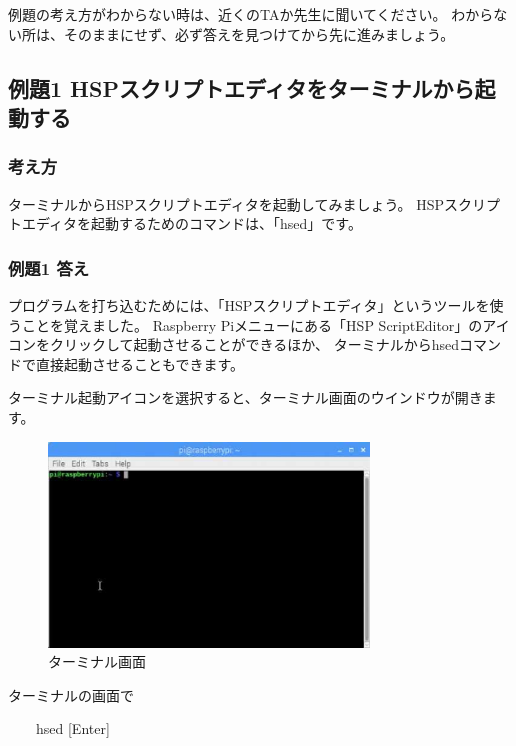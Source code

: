 \noindent
例題の考え方がわからない時は、近くのTAか先生に聞いてください。
わからない所は、そのままにせず、必ず答えを見つけてから先に進みましょう。
\clearpage

% 
% 
% 
\subsection{例題1 HSPスクリプトエディタをターミナルから起動する}

\subsubsection*{考え方}

ターミナルからHSPスクリプトエディタを起動してみましょう。
HSPスクリプトエディタを起動するためのコマンドは、「hsed」です。

\subsubsection*{例題1 答え}

プログラムを打ち込むためには、「HSPスクリプトエディタ」というツールを使うことを覚えました。
Raspberry Piメニューにある「HSP ScriptEditor」のアイコンをクリックして起動させることができるほか、
ターミナルからhsedコマンドで直接起動させることもできます。

ターミナル起動アイコンを選択すると、ターミナル画面のウインドウが開きます。

\begin{figure}[H]
  \begin{center}
    \includegraphics[keepaspectratio,width=8.52cm,height=5.45cm]{images/chap02/text02-img004.png}
    \caption{ターミナル画面}
  \end{center}
  \label{fig:terminal}
\end{figure}

ターミナルの画面で

\vspace{1em}
\ \ \ \ hsed [Enter]
\vspace{1em}

